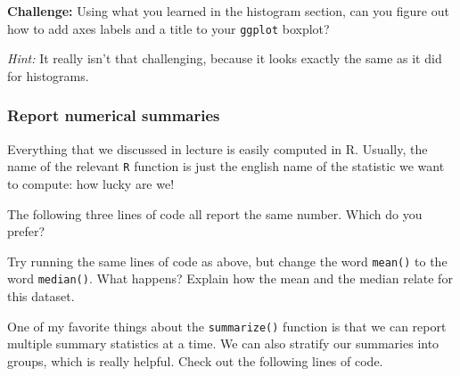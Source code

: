 \documentclass[
]{article}
\newenvironment{Shaded}{\begin{snugshade}}{\end{snugshade}}
\newcommand{\FunctionTok}[1]{\textcolor[rgb]{0.13,0.29,0.53}{\textbf{#1}}}
\newcommand{\NormalTok}[1]{#1}
\newcommand{\SpecialCharTok}[1]{\textcolor[rgb]{0.81,0.36,0.00}{\textbf{#1}}}
\begin{document}
\textbf{Challenge:} Using what you learned in the histogram section, can
you figure out how to add axes labels and a title to your
\texttt{ggplot} boxplot?

\emph{Hint:} It really isn't that challenging, because it looks exactly
the same as it did for histograms.

\subsubsection{Report numerical
summaries}\label{report-numerical-summaries}

Everything that we discussed in lecture is easily computed in R.
Usually, the name of the relevant \texttt{R} function is just the
english name of the statistic we want to compute: how lucky are we!

The following three lines of code all report the same number. Which do
you prefer?

\begin{Shaded}
\end{Shaded}

Try running the same lines of code as above, but change the word
\texttt{mean()} to the word \texttt{median()}. What happens? Explain how
the mean and the median relate for this dataset.

\begin{Shaded}
\end{Shaded}

One of my favorite things about the \texttt{summarize()} function is
that we can report multiple summary statistics at a time. We can also
stratify our summaries into groups, which is really helpful. Check out
the following lines of code.
\end{document}

